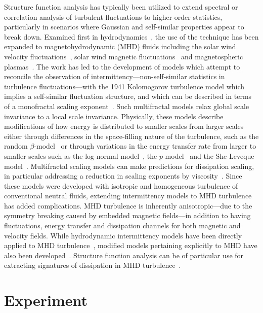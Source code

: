 \documentclass[preprint2]{aastex}
\begin{document}
Structure function analysis has typically been utilized to extend spectral or correlation analysis of turbulent fluctuations to higher-order statistics, particularly in scenarios where Gaussian and self-similar properties appear to break down. Examined first in hydrodynamics~\citep{anselmet1984,frisch1995}, the use of the technique has been expanded to magnetohydrodynamic (MHD) fluids including the solar wind velocity fluctuations~\citep{burlaga1991}, solar wind magnetic fluctuations~\citep{burlaga1992,tu1995} and magnetospheric plasmas~\citep{consolini1996,hnat2003}. The work has led to the development of models which attempt to reconcile the observation of intermittency---non-self-similar statistics in turbulence fluctuations---with the 1941 Kolomogorov turbulence model which implies a self-similar fluctuation structure, and which can be described in terms of a monofractal scaling exponent~\citep{kolmogorov1941,frisch1995}. Such multifractal models relax global scale invariance to a local scale invariance. Physically, these models describe modifications of how energy is distributed to smaller scales from larger scales either through differences in the space-filling nature of the turbulence, such as the random $\beta$-model~\citep{benzi1984} or through variations in the energy transfer rate from larger to smaller scales such as the log-normal model~\citep{kolmogorov1962}, the $p$-model~\citep{meneveau1987} and the She-Leveque model~\citep{she1994,dubrulle1994}. Multifractal scaling models can make predictions for dissipation scaling, in particular addressing a reduction in scaling exponents by viscosity~\citep{frisch1991,chevillard2005}. Since these models were developed with isotropic and homogeneous turbulence of conventional neutral fluids, extending intermittency models to MHD turbulence has added complications. MHD turbulence is inherently anisotropic---due to the symmetry breaking caused by embedded magnetic fields---in addition to having fluctuations, energy transfer and dissipation channels for both magnetic and velocity fields. While hydrodynamic intermittency models have been directly applied to MHD turbulence~\citep{burlaga1991,pagel2002}, modified models pertaining explicitly to MHD have also been developed~\citep{carbone1993,biskamp1994,muller2000,biskamp2000,boldyrev2002,cho2003}. Structure function analysis can be of particular use for extracting signatures of dissipation in MHD turbulence~\citep{cho2003,alexandrova2008,kiyani2009,kiyani2013}.

\section{Experiment}\label{sec:experiment}
\end{document}
